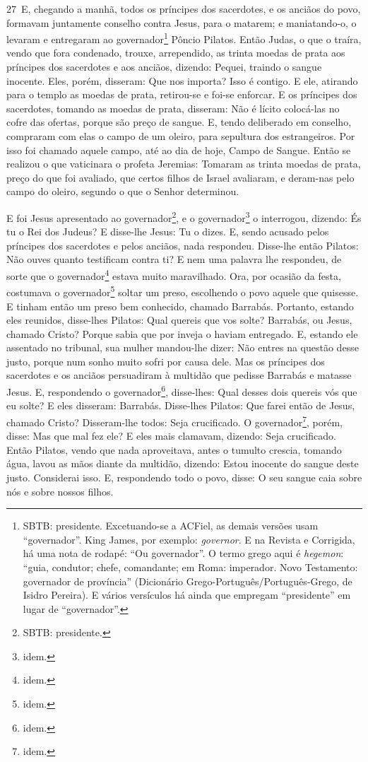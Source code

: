 \lettrine{27}\ E, chegando a manhã, todos os príncipes dos
sacerdotes, e os anciãos do povo, formavam juntamente conselho
contra Jesus, para o matarem; e maniatando-o, o levaram e
entregaram ao governador\footnote{SBTB: presidente. Excetuando-se a
ACFiel, as demais versões usam ``governador''. King James, por
exemplo: \emph{governor}. E na Revista e Corrigida, há uma nota de
rodapé: ``Ou governador''. O termo grego aqui é \emph{hegemon}:
``guia, condutor; chefe, comandante; em Roma: imperador. Novo
Testamento: governador de província'' (Dicionário
Grego-Português/Português-Grego, de Isidro Pereira). E vários
versículos há ainda que empregam ``presidente'' em lugar de
``governador''.} Pôncio Pilatos. Então Judas, o que o traíra,
vendo que fora condenado, trouxe, arrependido, as trinta moedas de
prata aos príncipes dos sacerdotes e aos anciãos, dizendo:
Pequei, traindo o sangue inocente. Eles, porém, disseram: Que nos
importa? Isso é contigo. E ele, atirando para o templo as moedas
de prata, retirou-se e foi-se enforcar. E os príncipes dos
sacerdotes, tomando as moedas de prata, disseram: Não é lícito
colocá-las no cofre das ofertas, porque são preço de sangue. E,
tendo deliberado em conselho, compraram com elas o campo de um
oleiro, para sepultura dos estrangeiros. Por isso foi chamado
aquele campo, até ao dia de hoje, Campo de Sangue. Então se
realizou o que vaticinara o profeta Jeremias: Tomaram as trinta
moedas de prata, preço do que foi avaliado, que certos filhos de
Israel avaliaram, e deram-nas pelo campo do oleiro, segundo o
que o Senhor determinou.

E foi Jesus apresentado ao governador\footnote{SBTB:
presidente.}, e o governador\footnote{idem.} o interrogou, dizendo:
És tu o Rei dos Judeus? E disse-lhe Jesus: Tu o dizes. E,
sendo acusado pelos príncipes dos sacerdotes e pelos anciãos, nada
respondeu. Disse-lhe então Pilatos: Não ouves quanto
testificam contra ti? E nem uma palavra lhe respondeu, de
sorte que o governador\footnote{idem.} estava muito maravilhado.
Ora, por ocasião da festa, costumava o
governador\footnote{idem.} soltar um preso, escolhendo o povo aquele
que quisesse. E tinham então um preso bem conhecido, chamado
Barrabás. Portanto, estando eles reunidos, disse-lhes
Pilatos: Qual quereis que vos solte? Barrabás, ou Jesus, chamado
Cristo? Porque sabia que por inveja o haviam entregado.
E, estando ele assentado no tribunal, sua mulher mandou-lhe
dizer: Não entres na questão desse justo, porque num sonho muito
sofri por causa dele. Mas os príncipes dos sacerdotes e os
anciãos persuadiram à multidão que pedisse Barrabás e matasse Jesus.
E, respondendo o governador\footnote{idem.}, disse-lhes: Qual
desses dois quereis vós que eu solte? E eles disseram: Barrabás.
Disse-lhes Pilatos: Que farei então de Jesus, chamado Cristo?
Disseram-lhe todos: Seja crucificado. O
governador\footnote{idem.}, porém, disse: Mas que mal fez ele? E
eles mais clamavam, dizendo: Seja crucificado. Então Pilatos,
vendo que nada aproveitava, antes o tumulto crescia, tomando água,
lavou as mãos diante da multidão, dizendo: Estou inocente do sangue
deste justo. Considerai isso. E, respondendo todo o povo,
disse: O seu sangue caia sobre nós e sobre nossos filhos.

